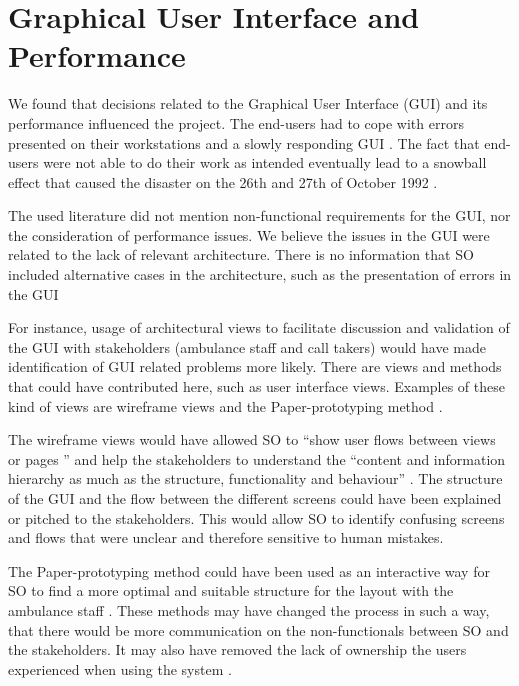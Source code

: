 \section*{Graphical User Interface and Performance}

We found that decisions related to the Graphical User Interface (GUI) and its performance influenced the project.
The end-users had to cope with errors presented on their workstations \autocite[704]{beynon1999human} and a slowly responding GUI \autocite[3126]{officialreport}.
The fact that end-users were not able to do their work as intended eventually lead to a snowball effect that caused the disaster on the 26th and 27th of October 1992 \autocite[1017w]{officialreport}.

The used literature did not mention non-functional requirements for the GUI, nor the consideration of performance issues.
We believe the issues in the GUI were related to the lack of relevant architecture.
There is no information that SO included alternative cases in the architecture, such as the presentation of errors in the GUI

For instance, usage of architectural views to facilitate discussion and validation of the GUI with stakeholders (ambulance staff and call takers) would have made identification of GUI related problems more likely.
There are views and methods that could have contributed here, such as user interface views.
Examples of these kind of views are wireframe views and the Paper-prototyping method \autocite{uxpin}\autocite{snyder2003paper}.

The wireframe views would have allowed SO to ``show user flows between views or pages \autocite[7]{uxpin}'' and help the stakeholders to understand the
``content and information hierarchy as much as the structure, functionality and behaviour'' \autocite[9]{uxpin}.
The structure of the GUI and the flow between the different screens could have been explained or pitched to the stakeholders. This would allow SO to identify confusing screens and flows that were unclear and therefore sensitive to human mistakes.

The Paper-prototyping method could have been used as an interactive way for SO to find a more optimal and suitable structure for the layout with the ambulance staff \autocite[345]{snyder2003paper}.
These methods may have changed the process in such a way, that there would be more communication on the non-functionals between SO and the stakeholders.
It may also have removed the lack of ownership the users experienced when using the system \autocite[1007o]{officialreport}.

